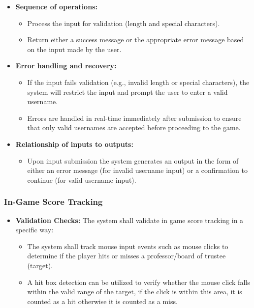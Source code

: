 \documentclass{article}
\begin{document}
\begin{itemize}
    \item \textbf{Sequence of operations:}
        \begin{itemize}
            \item Process the input for validation (length and special characters).
            \item Return either a success message or the appropriate error message based on the input made by the user.
        \end{itemize}
\end{itemize}

\begin{itemize}
    \item \textbf{Error handling and recovery:}
        \begin{itemize}
            \item If the input fails validation (e.g., invalid length or special characters), the system will restrict the input and prompt the user to enter a valid username.
            \item Errors are handled in real-time immediately after submission to ensure that only valid usernames are accepted before proceeding to the game.
        \end{itemize}
\end{itemize}

\begin{itemize}
    \item \textbf{Relationship of inputs to outputs:}
        \begin{itemize}
            \item Upon input submission the system generates an output in the form of either an error message (for invalid username input) or a confirmation to continue (for valid username input).
        \end{itemize}
\end{itemize}



\subsubsection{In-Game Score Tracking}
\begin{itemize}
    \item \textbf{Validation Checks:}
        The system shall validate in game score tracking in a specific way: 
        \begin{itemize}
            \item The system shall track mouse input events such as mouse clicks to determine if the player hits or misses a professor/board of trustee (target).

            \item A hit box detection can be utilized to verify whether the mouse click falls within the valid range of the target, if the click is within this area, it is counted as a hit otherwise it is counted as a miss.

        \end{itemize}
\end{itemize}
\end{document}
